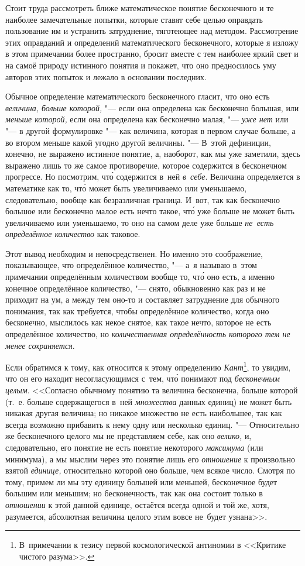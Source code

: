 Стоит труда рассмотреть ближе математическое понятие бесконечного и те наиболее
замечательные попытки, которые ставят себе целью оправдать пользование им
и устранить затруднение, тяготеющее над методом. Рассмотрение этих оправданий
и определений математического бесконечного, которые я изложу в этом примечании
более пространно, бросит вместе с тем наиболее яркий свет и на самоё природу
истинного понятия и покажет, что оно предносилось уму авторов этих попыток
и лежало в основании последних.

Обычное определение математического бесконечного гласит, что оно есть
{\em величина, больше которой,} "--- если она определена как бесконечно
большая, или {\em меньше которой,} если она определена как бесконечно малая,
"--- {\em уже нет} или "--- в другой формулировке "--- как величина, которая
в первом случае больше, а во втором меньше какой угодно другой величины. "---
В~этой дефиниции, конечно, не выражено истинное понятие, а, наоборот, как мы
уже заметили, здесь выражено лишь то же самое противоречие, которое содержится
в бесконечном прогрессе. Но посмотрим, чт\'{о} содержится в~ней
{\em в~себе}. Величина определяется в математике как то, чт\'{о} может быть
увеличиваемо или уменьшаемо, следовательно, вообще как безразличная граница.
И~вот, так как бесконечно большое или бесконечно малое есть нечто такое, чт\'{о}
уже больше не может быть увеличиваемо или уменьшаемо, то оно на самом деле уже
больше {\em не~есть определённое количество} как таковое.

Этот вывод необходим и непосредственен. Но именно это соображение,
показывающее, что определённое количество, "--- а~я называю в~этом примечании
определённым количеством вообще то, чт\'{о} оно есть, а именно конечное определённое количество,
"--- снято, обыкновенно как раз и не приходит на ум, а между тем оно-то
и составляет затруднение для обычного понимания, так как требуется, чтобы
определённое количество, когда оно бесконечно, мыслилось как некое снятое,
как такое нечто, которое не есть определённое количество, но
{\em количественная определённость которого тем не менее сохраняется}.

Если обратимся к тому, как относится к этому определению
{\em Кант}\footnote{В~примечании к тезису первой космологической антиномии
в <<Критике чистого разума>>.}, то увидим, что он его находит несогласующимся
с~тем, чт\'{о} понимают под {\em бесконечным целым}. <<Согласно обычному
понятию та величина бесконечна, больше которой (т.~е. больше содержащегося
в~ней {\em множества} данных единиц) не может быть никакая другая величина; но
никакое множество не есть наибольшее, так как всегда возможно прибавить к нему
одну или несколько единиц. "--- Относительно же бесконечного целого мы не
представляем себе, как оно {\em велико,} и, следовательно, его понятие не есть
понятие некоторого {\em максимума} (или минимума), а мы мыслим через это
понятие лишь его {\em отношение} к произвольно взятой {\em единице,}
относительно которой оно больше, чем всякое число. Смотря по тому, примем ли
мы эту единицу большей или меньшей, бесконечное будет большим или меньшим; но
бесконечность, так как она состоит только в {\em отношении} к этой данной
единице, остаётся всегда одной и той же, хотя, разумеется, абсолютная величина
целого этим вовсе не~будет узнана>>.

